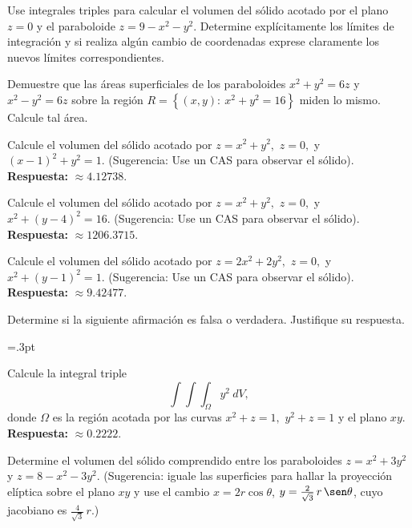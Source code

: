 \begin{prob}
Use integrales triples para calcular el volumen del sólido acotado por el plano $z=0$ y el paraboloide $z=9-x^2-y^2.$ Determine explícitamente los límites de integración y si realiza algún cambio de coordenadas exprese claramente los nuevos límites correspondientes.
\end{prob}


\begin{prob}
Demuestre que las áreas superficiales de los paraboloides $x^2+y^2=6z$ y $x^2-y^2=6z$ sobre la región $R=\left\lbrace (x,y):\ x^2+y^2=16 \right\rbrace$ miden lo mismo. Calcule tal área.
\end{prob}


\begin{prob}
Calcule el volumen del sólido acotado por $z=x^2+y^2,$ $z=0,$ y $(x-1)^2+y^2=1.$ (Sugerencia: Use un CAS para observar el sólido). \textbf{Respuesta:} $\approx  4.12738$.
\end{prob}


\begin{prob}
Calcule el volumen del sólido acotado por $z=x^2+y^2,$ $z=0,$ y $x^2+(y-4)^2=16.$ (Sugerencia: Use un CAS para observar el sólido). \textbf{Respuesta:} $\approx 1206.3715$.
\end{prob}

\begin{prob}
Calcule el volumen del sólido acotado por $z=2x^2+2y^2,$ $z=0,$ y $x^2+(y-1)^2=1.$ (Sugerencia: Use un CAS para observar el sólido). \textbf{Respuesta:} $\approx 9.42477$.
\end{prob}

\begin{prob}
Determine si la siguiente afirmación es falsa o verdadera. Justifique su respuesta.
\begin{center}
{\fboxrule=.3pt \fboxsep=3pt}        
\end{center}   
\end{prob}

\begin{prob}
Calcule  la  integral triple $$\displaystyle\int\int\int_{\Omega}y^2\  dV,$$ donde $\Omega$ es la región acotada por las curvas $x^2+z=1,$  $y^2+z=1$ y el plano $xy$. \textbf{Respuesta:} $\approx 0.2222$.
\end{prob}

\begin{prob}
Determine el volumen del sólido comprendido entre los paraboloides
$z=x^2+3y^2$ y $z=8-x^2-3y^2$. (Sugerencia: iguale las superficies para
hallar la proyección elíptica sobre el plano $xy$ y use el cambio
$x=2r\cos\theta$, $y=\tfrac{2}{\sqrt3}\,r\,\sen\theta$, cuyo jacobiano es
$\tfrac{4}{\sqrt3}\,r$.)
\end{prob}



